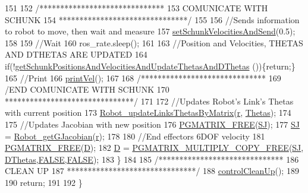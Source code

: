 \begin{DoxyCode}
151 
152                 \textcolor{comment}{/******************************}
153 \textcolor{comment}{                        COMUNICATE WITH SCHUNK}
154 \textcolor{comment}{                *******************************/}
155 
156                 \textcolor{comment}{//Sends information to robot to move, then wait and measure}
157                 \hyperlink{classCartesian__controller_a40d17a9794af8a9a607618bf0ee5efff}{setSchunkVelocitiesAndSend}(0.5);
158 
159                 \textcolor{comment}{//Wait}
160                 ros\_rate.sleep();
161 
163                 \textcolor{comment}{//Position and Velocities, THETAS AND DTHETAS ARE UPDATED}
164                 \textcolor{keywordflow}{if}(!\hyperlink{classCartesian__controller_a0d7a63bac84715f6742db738df246f91}{getSchunkPositionsAndVelocitiesAndUpdateThetasAndDThetas}
      ())\{\textcolor{keywordflow}{return};\}
165                 \textcolor{comment}{//Print}
166                 \hyperlink{classCartesian__velocity__controller_ad5dbfc4b8ec4fad7bca9b9a4fd9358b4}{printVel}();
167 
168                 \textcolor{comment}{/******************************}
169 \textcolor{comment}{                /END    COMUNICATE WITH SCHUNK}
170 \textcolor{comment}{                *******************************/}
171 
172                 \textcolor{comment}{//Updates Robot's Link's Thetas with current position}
173                 \hyperlink{robot_8h_aa1d3aca5132bd5f347f5966d38fbb966}{Robot\_updateLinksThetasByMatrix}(\hyperlink{classCartesian__controller_a5562129951bd802e4ded77fc716c87a0}{r},
      \hyperlink{classCartesian__controller_a0a0f818dad601cd9e3e26cb6959b8eb6}{Thetas});
174 
175                 \textcolor{comment}{//Updates Jacobian with new position}
176                 \hyperlink{gmatrix_8h_a9a73b4e0a77f386c0bae1bba75298d1d}{PGMATRIX\_FREE}(\hyperlink{classCartesian__controller_a98fdac06d136ac3dba0102d97cd5dd36}{SJ});
177                 \hyperlink{classCartesian__controller_a98fdac06d136ac3dba0102d97cd5dd36}{SJ}  = \hyperlink{robot_8h_a61464c237c56f3db3f79b0350df80ddb}{Robot\_getGJacobian}(\hyperlink{classCartesian__controller_a5562129951bd802e4ded77fc716c87a0}{r});
178 
180                 \textcolor{comment}{//End effectors 6DOF velocity}
181                 \hyperlink{gmatrix_8h_a9a73b4e0a77f386c0bae1bba75298d1d}{PGMATRIX\_FREE}(\hyperlink{classCartesian__controller_a8c470b652ce436d8e48f126073fc2593}{D});
182                 \hyperlink{classCartesian__controller_a8c470b652ce436d8e48f126073fc2593}{D} = \hyperlink{gmatrix__plus_8h_a17b482a0aaa68d1f4c1c30a1a72dacbb}{PGMATRIX\_MULTIPLY\_COPY\_FREE}(\hyperlink{classCartesian__controller_a98fdac06d136ac3dba0102d97cd5dd36}{SJ},
      \hyperlink{classCartesian__controller_a5d6419e62e130150edfcbd82b1dadcae}{DThetas},\hyperlink{gmatlabdatafile_8h_aa93f0eb578d23995850d61f7d61c55c1}{FALSE},\hyperlink{gmatlabdatafile_8h_aa93f0eb578d23995850d61f7d61c55c1}{FALSE});
183         \}
184 
185         \textcolor{comment}{/******************************}
186 \textcolor{comment}{                        CLEAN UP}
187 \textcolor{comment}{        *******************************/}
188         \hyperlink{classCartesian__controller_a8c0f0b41de9f4f8b2e3aa327e7c6b50c}{controlCleanUp}();
189 
190         \textcolor{keywordflow}{return};
191 
192 \}
\end{DoxyCode}



